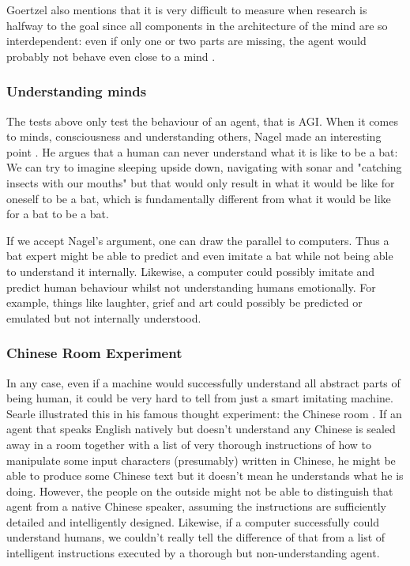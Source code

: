 \documentclass[11pt]{article}
\newcommand{\dr}[1]{{\color{dark-cornflower-blue-2} #1}}
\begin{document}
\dr{Goertzel also mentions that it is very difficult to measure when research is halfway to the goal since all components in the architecture of the mind are so interdependent: even if only one or two parts are missing, the agent would probably not behave even close to a mind \cite{goertzel2012agi}.} 

\subsubsection*{Understanding minds}

The tests above only test the behaviour of an agent, that is AGI. When it comes to minds, consciousness and understanding others, Nagel made an interesting point \cite{nagel1974like}. He argues that a human can never understand what it is like to be a bat: We can try to imagine sleeping upside down, navigating with sonar and "catching insects with our mouths" but that would only result in what it would be like for oneself to be a bat, which is fundamentally different from what it would be like for a bat to be a bat.


If we accept Nagel's argument, one can draw the parallel to computers. Thus a bat expert might be able to predict and even imitate a bat while not being able to understand it internally. Likewise, a computer could possibly imitate and predict human behaviour whilst not understanding humans emotionally. For example, things like laughter, grief and art could possibly be predicted or emulated but not internally understood.

\subsubsection*{Chinese Room Experiment}
\label{sec:chinese_room}

In any case, even if a machine would successfully understand all abstract parts of being human, it could be very hard to tell from just a smart imitating machine. Searle illustrated this in his famous thought experiment: the Chinese room \cite{searle1980minds}. If an agent that speaks English natively but doesn't understand any Chinese is sealed away in a room together with a list of very thorough instructions of how to manipulate some input characters (presumably) written in Chinese, he might be able to produce some Chinese text but it doesn't mean he understands what he is doing. However, the people on the outside might not be able to distinguish that agent from a native Chinese speaker, assuming the instructions are sufficiently detailed and intelligently designed. Likewise, if a computer successfully could understand humans, we couldn't really tell the difference of that from a list of intelligent instructions executed by a thorough but non-understanding agent.
\end{document}
